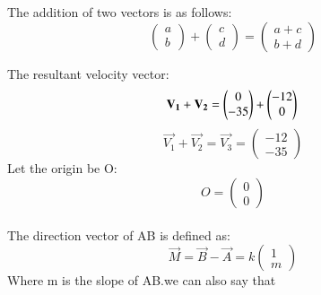 \documentclass[journal]{IEEEtran}
\begin{document}
The addition of two vectors is as follows:\\
\begin{equation}
    \begin{pmatrix}
        a\\
        b
    \end{pmatrix}
    +\begin{pmatrix}
        c\\
        d
    \end{pmatrix}
    =\begin{pmatrix}
        a+c\\
        b+d
    \end{pmatrix}
\end{equation}


The resultant velocity vector:\\
\begin{equation}
\vec{V_{1}}+\vec{V_{2}}=\begin{pmatrix}
    0\\
    -35
\end{pmatrix}
+
\begin{pmatrix}
    -12\\
    0
\end{pmatrix}\\
\end{equation}
\begin{equation}
    \vec{V_{1}}+\vec{V_{2}}=\vec{V_{3}}=\begin{pmatrix}
        -12\\
        -35
    \end{pmatrix}
\end{equation}
Let the origin be O:
\begin{equation}
    O=\begin{pmatrix}
        0\\
        0
    \end{pmatrix}
\end{equation}\\


The direction vector of AB is defined as:
\begin{equation}
    \vec{M}=\vec{B}-\vec{A}=k\begin{pmatrix}
        1\\
        m
    \end{pmatrix}
\end{equation}
Where m is the slope of AB.we can also say that\\
\end{document}
